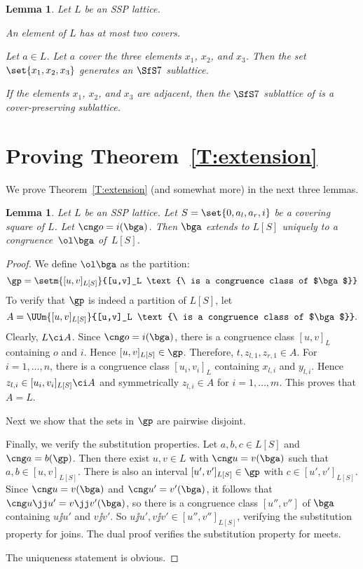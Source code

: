 \documentclass{amsart}
\theoremstyle{plain}
\newtheorem{lemma}[theorem]{Lemma}
\theoremstyle{definition}
\begin{document}
\begin{lemma}\label{L:known}
Let $L$ be an SSP lattice. 
\begin{enumeratei}
\item An element of $L$ has at most two covers.

\item Let $a \in L$. 
Let $a$ cover the three elements $x_1$, $x_2$, and $x_3$.
Then the set $\set{x_1,x_2,x_3}$ generates an $\SfS 7$ sublattice.

\item If the elements $x_1$, $x_2$, and $x_3$ are adjacent, 
then the $\SfS 7$ sublattice of  is a cover-preserving sublattice.

\end{enumeratei}
\end{lemma}

\section{Proving Theorem~\ref{T:extension}}\label{S:fork}

We prove Theorem~\ref{T:extension} (and somewhat more) 
in the next three lemmas.

\begin{lemma}\label{L:extend1}
Let $L$ be an SSP lattice. 
Let $S = \set{0,a_l,a_r,i}$ be a covering square of $L$.  
Let $\cng o=i(\bga)$.
Then $\bga$ extends to $L[S]$ uniquely to a congruence~${\ol \bga}$ of~$L[S]$.
\end{lemma}

\begin{proof}
We define ${\ol \bga}$ as the partition:
\[
  \gp =  \setm{[u,v]_{L[S]}}{[u,v]_L \text{\ is a congruence class of $\bga$}}
\]
To verify that $\gp$ is indeed a partition of $L[S]$, let
\[
   A =  \UUm{[u,v]_{L[S]}}{[u,v]_L 
        \text{\ is a congruence class of $\bga$}}.
\]
Clearly, $L \ci A$. Since $\cng o=i(\bga)$, there is a 
congruence class $[u,v]_{L}$ containing $o$ and $i$. 
Hence  $[u,v]_{L[S]} \in \gp$. Therefore, $t, z_{l,1}, z_{r,1} \in A$.
For $i = 1, \dots, n$,  there is a 
congruence class $[u_i,v_i]_{L}$ containing $x_{l,i}$ and $ y_{l,i}$.
Hence $z_{l,i} \in [u_i,v_i]_{L[S]} \ci A$ and symmetrically  $z_{l,i} \in A$
for $i = 1, \dots, m$. This proves that $A = L$.

Next we show that the sets in $\gp$ are pairwise disjoint.

Finally, we verify the substitution properties. 
Let $a,b,c \in L[S]$ and $\cng a=b(\gp)$.
Then there exist $u,v \in L$ with  $\cng u=v(\bga)$ such that  $a,b \in [u,v]_{L[S]}$. 
There is also an interval $[u',v']_{L[S]} \in \gp$ with $c \in [u',v']_{L[S]}$.
Since $\cng u=v(\bga)$ and  $\cng u'=v'(\bga)$, it follows that 
$\cng u\jj u'=v \jj v'(\bga)$, so there is a congruence class $[u'',v'']$ of $\bga$ 
containing $u\jj u'$ and $v \jj v'$. 
So $u\jj u', v \jj v' \in [u'',v'']_{L[S]}$, 
verifying the substitution property for joins. 
The dual proof verifies the substitution property for meets.

The uniqueness statement is obvious.
\end{proof}
\end{document}
